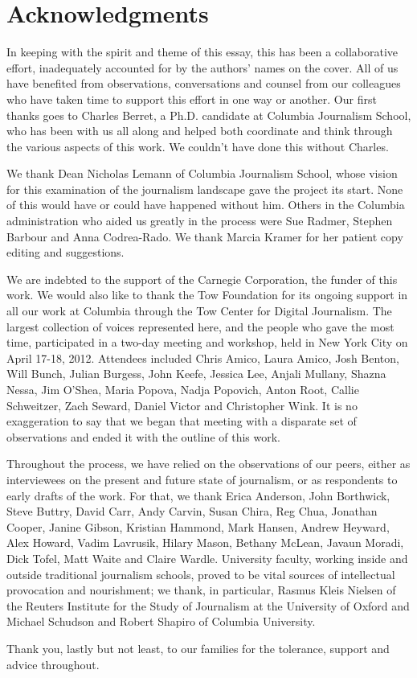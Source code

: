 \chapter{Acknowledgments}
In keeping with the spirit and theme of this essay, this has been a collaborative
effort, inadequately accounted for by the authors’ names on the cover. All of us
have benefited from observations, conversations and counsel from our colleagues
who have taken time to support this effort in one way or another.
Our first thanks goes to Charles Berret, a Ph.D. candidate at Columbia
Journalism School, who has been with us all along and helped both coordinate
and think through the various aspects of this work. We couldn’t have done this
without Charles.

We thank Dean Nicholas Lemann of Columbia Journalism School, whose vision
for this examination of the journalism landscape gave the project its start. None
of this would have or could have happened without him. Others in the Columbia
administration who aided us greatly in the process were Sue Radmer, Stephen
Barbour and Anna Codrea-Rado. We thank Marcia Kramer for her patient
copy editing and suggestions.

We are indebted to the support of the Carnegie Corporation, the funder of this
work. We would also like to thank the Tow Foundation for its ongoing support in
all our work at Columbia through the Tow Center for Digital Journalism.
The largest collection of voices represented here, and the people who gave the
most time, participated in a two-day meeting and workshop, held in New York
City on April 17-18, 2012. Attendees included Chris Amico, Laura Amico, Josh
Benton, Will Bunch, Julian Burgess, John Keefe, Jessica Lee, Anjali Mullany,
Shazna Nessa, Jim O’Shea, Maria Popova, Nadja Popovich, Anton Root, Callie
Schweitzer, Zach Seward, Daniel Victor and Christopher Wink. It is no exaggeration
to say that we began that meeting with a disparate set of observations and
ended it with the outline of this work.

Throughout the process, we have relied on the observations of our peers, either
as interviewees on the present and future state of journalism, or as respondents
to early drafts of the work. For that, we thank Erica Anderson, John Borthwick,
Steve Buttry, David Carr, Andy Carvin, Susan Chira, Reg Chua, Jonathan
Cooper, Janine Gibson, Kristian Hammond, Mark Hansen, Andrew Heyward,
Alex Howard, Vadim Lavrusik, Hilary Mason, Bethany McLean, Javaun Moradi,
Dick Tofel, Matt Waite and Claire Wardle. University faculty, working inside and
outside traditional journalism schools, proved to be vital sources of intellectual
provocation and nourishment; we thank, in particular, Rasmus Kleis Nielsen of
the Reuters Institute for the Study of Journalism at the University of Oxford and
Michael Schudson and Robert Shapiro of Columbia University.

Thank you, lastly but not least, to our families for the tolerance, support and
advice throughout.